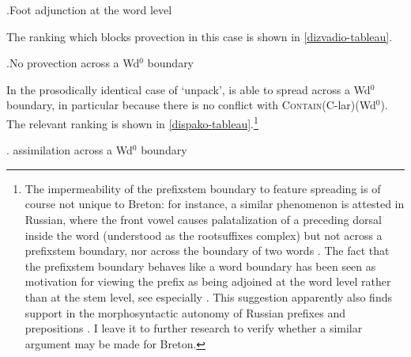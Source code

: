 \ex.\label{disgweadenn-geom}Foot adjunction at the word level\\

The ranking which blocks provection in this case is shown in \ref{dizvadio-tableau}.

\ex.\label{dizvadio-tableau}No provection across a Wd$^{0}$ boundary\\
\wraptbl{}

In the prosodically identical case of \ipa{[ˌdisˈpako]} `unpack',  is able to spread across a Wd$^{0}$ boundary, in particular because there is no conflict with \textsc{Contain}(C-lar)(Wd$^{0}$). The relevant ranking is shown in \ref{dispako-tableau}.\footnote{The impermeability of the prefix\endash stem boundary to feature spreading is of course not unique to Breton: for instance, a similar phenomenon is attested in Russian, where the front vowel \ipa{[i]} causes palatalization of a preceding dorsal inside the word (understood as the root\endash suffixes complex) but not across a prefix\endash stem boundary, nor across the boundary of two words \citep[\egm][]{plapp1996,plapp99,rubach2000,blumenfeld03,gribanova08:_russian_strat_ot,gribanova09:_phonol_russian,padgett:_fasl18,iosad10:_palatalization}. The fact that the prefix\endash stem boundary behaves like a word boundary has been seen as motivation for viewing the prefix as being adjoined at the word level rather than at the stem level, see especially \citet{blumenfeld03,gribanova08:_russian_strat_ot}. This suggestion apparently also finds support in the morphosyntactic autonomy of Russian prefixes and prepositions \citep[\egm][]{svenonius08:_russian}. I leave it to further research to verify whether a similar argument may be made for Breton.}

\ex.\label{dispako-tableau} assimilation across a Wd$^{0}$ boundary\\
\wraptbl[.8\columnwidth]{}

